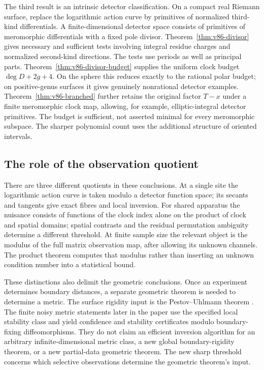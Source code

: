 The third result is an intrinsic detector classification. On a compact
real Riemann surface, replace the logarithmic action curve by primitives
of normalized third-kind differentials. A finite-dimensional detector
space consists of primitives of meromorphic differentials with a fixed
pole divisor. Theorem~\ref{thm:v86-divisor} gives necessary and
sufficient tests involving integral residue charges and normalized
second-kind directions. The tests use periods as well as principal
parts. Theorem~\ref{thm:v86-divisor-budget} supplies the uniform
clock budget $\deg D+2g+4$. On the sphere this reduces exactly to
the rational polar budget; on positive-genus surfaces it gives genuinely
nonrational detector examples. Theorem~\ref{thm:v86-branched} further
retains the original factor $T-x$ under a finite meromorphic clock map,
allowing, for example, elliptic-integral detector primitives. The budget
is sufficient, not asserted
minimal for every meromorphic subspace. The sharper polynomial count
uses the additional structure of oriented intervals.

\subsection{The role of the observation quotient}
There are three different quotients in these conclusions. At a single
site the logarithmic action curve is taken modulo a detector function
space; its secants and tangents give exact fibres and local inversion.
For shared apparatus the nuisance consists of functions of the clock
index alone on the product of clock and spatial domains; spatial
contrasts and the residual permutation ambiguity determine a different
threshold. At finite sample size the relevant object is the modulus
of the full matrix observation map, after allowing its unknown channels.
The product theorem computes that modulus rather than inserting an
unknown condition number into a statistical bound.

These distinctions also delimit the geometric conclusions. Once an
experiment determines boundary distances, a separate geometric theorem
is needed to determine a metric. The surface rigidity input is the
Pestov--Uhlmann theorem \cite{V84PU}. The finite noisy metric statements
later in the paper use the specified local stability class and yield
confidence and stability certificates modulo boundary-fixing
diffeomorphisms. They do not claim an efficient inversion algorithm for
an arbitrary infinite-dimensional metric class, a new global
boundary-rigidity theorem, or a new partial-data geometric theorem.
The new sharp threshold concerns which selective observations determine
the geometric theorem's input.

